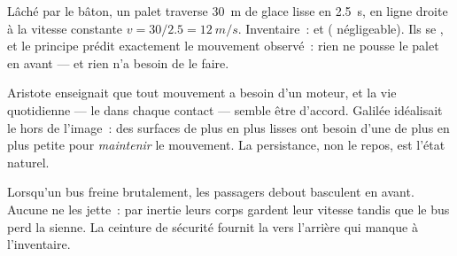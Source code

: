 \begin{example}\label{ex:g10:inertia:puck}
Lâché par le bâton, un palet traverse \qty{30}{m} de glace lisse en
\qty{2.5}{s}, en ligne droite à la vitesse constante
$v = 30/2.5 = \qty{12}{m/s}$. Inventaire~:  et
 ( négligeable).
Ils se , et le principe prédit exactement le
mouvement observé~: rien ne pousse le palet en avant --- et rien n'a
besoin de le faire.
\end{example}

\begin{remark}
Aristote enseignait que tout mouvement a besoin d'un moteur, et la vie
quotidienne --- le  dans chaque contact --- semble
être d'accord. Galilée idéalisait le  hors de
l'image~: des surfaces de plus en plus lisses ont besoin d'une 
de plus en plus petite pour \emph{maintenir} le mouvement. La
persistance, non le repos, est l'état naturel.
\end{remark}

\begin{remark}
Lorsqu'un bus freine brutalement, les passagers debout basculent en
avant. Aucune  ne les jette~: par inertie leurs corps
gardent leur vitesse tandis que le bus perd la sienne. La ceinture de
sécurité fournit la  vers l'arrière qui manque à
l'inventaire.
\end{remark}

